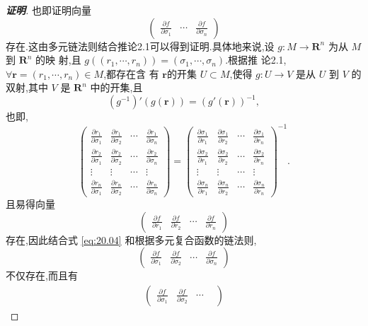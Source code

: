 \documentclass[a4paper]{article}
\newcommand{\pa}{\partial} \newcommand{\Om}{\Omega}
\begin{document}
\begin{proof}[\bf{证明}]
  也即证明向量
$$
\begin{pmatrix}
  \frac{\pa f}{\pa\sigma_1}&\cdots&\frac{\pa f}{\pa \sigma_n}
\end{pmatrix}
$$
存在.这由多元链法则结合推论2.1可以得到证明.具体地来说,设 $g:M\to
\mathbf{R}^n$ 为从 $M$ 到 $\mathbf{R}^n$ 的映
射,且 $g((r_1,\cdots,r_n))=(\sigma_1,\cdots,\sigma_n)$.根据推
论2.1,$\forall \mathbf{r}=(r_1,\cdots,r_n)\in M$,都存在含
有 $\mathbf{r}$的开集 $U\subset M$,使得 $g:U\to V$ 是从 $U$ 到 $V$ 的
双射,其中 $V$ 是 $\mathbf{R}^n$ 中的开集,且
$$
(g^{-1})'(g(\mathbf{r}))=(g'(\mathbf{r}))^{-1},
$$
也即,
\begin{equation}\label{eq:20.04}
  \begin{pmatrix}
    \frac{\pa r_1}{\pa \sigma_1}&\frac{\pa r_1}{\pa
      \sigma_2}&\cdots&\frac{\pa
      r_1}{\pa \sigma_n}\\
    \frac{\pa r_2}{\pa \sigma_1}&\frac{\pa r_2}{\pa
      \sigma_2}&\cdots&\frac{\pa
      r_2}{\pa \sigma_n}\\
    \vdots&\vdots&\cdots&\vdots\\
    \frac{\pa r_n}{\pa \sigma_1}&\frac{\pa r_n}{\pa
      \sigma_2}&\cdots&\frac{\pa r_n}{\pa \sigma_n}
  \end{pmatrix}=
  \begin{pmatrix}
    \frac{\pa \sigma_1}{\pa r_1}&\frac{\pa\sigma_1}{\pa
      r_2}&\cdots&\frac{\pa
      \sigma_1}{\pa r_n}\\
    \frac{\pa \sigma_2}{\pa r_1}&\frac{\pa \sigma_2}{\pa
      r_2}&\cdots&\frac{\pa
      \sigma_2}{\pa r_n}\\
    \vdots&\vdots&\cdots&\vdots\\
    \frac{\pa \sigma_n}{\pa r_1}&\frac{\pa\sigma_n}{\pa
      r_2}&\cdots&\frac{\pa \sigma_n}{\pa r_n}
  \end{pmatrix}^{-1}.
\end{equation}
且易得向量
$$
\begin{pmatrix}
  \frac{\pa f}{\pa r_1}& \frac{\pa f}{\pa r_2}& \cdots& \frac{\pa
    f}{\pa r_n}
\end{pmatrix}
$$
存在,因此结合式 \eqref{eq:20.04} 和根据多元复合函数的链法则,
$$
\begin{pmatrix}
  \frac{\pa f}{\pa \sigma_1}& \frac{\pa f}{\pa \sigma_2}& \cdots&
  \frac{\pa f}{\pa \sigma_n}
\end{pmatrix}
$$
不仅存在,而且有
\begin{align*}
  \begin{pmatrix}
    \frac{\pa f}{\pa \sigma_1}& \frac{\pa f}{\pa \sigma_2}& \cdots&

\end{pmatrix}
\end{align*}
\end{proof}
\end{document}
